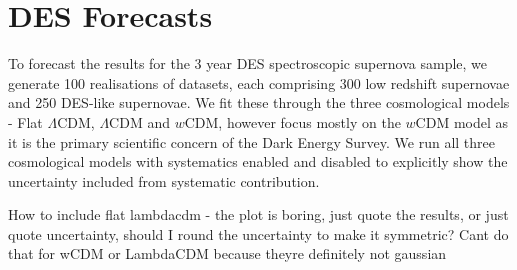 \documentclass[a4paper,fleqn,usenatbib]{mnras}
\newcommand{\red}{\color{red}}
\begin{document}
%
%
%
%



\section{DES Forecasts}
\label{sec:forecasts}

To forecast the results for the 3 year DES spectroscopic supernova sample, we generate 100 realisations of datasets, each comprising 300 low redshift supernovae and 250 DES-like supernovae. We fit these through the three cosmological models - Flat $\Lambda$CDM, $\Lambda$CDM and $w$CDM, however focus mostly on the $w$CDM model as it is the primary scientific concern of the Dark Energy Survey. We run all three cosmological models with systematics enabled and disabled to explicitly show the uncertainty included from systematic contribution.

{\red How to include flat lambdacdm - the plot is boring, just quote the results, or just quote uncertainty, should I round the uncertainty to make it symmetric? Cant do that for wCDM or LambdaCDM because theyre definitely not gaussian}
\end{document}
